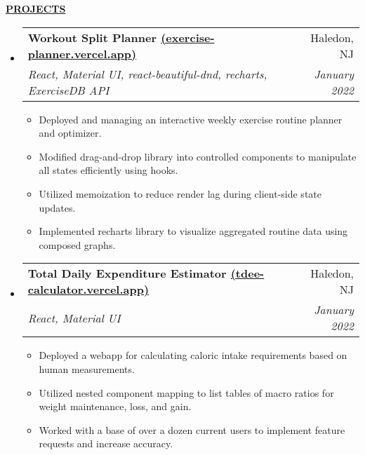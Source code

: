 \documentclass[letterpaper,11pt]{article}
\makeatletter
\newcommand{\resheading}[1]{{{\begin{minipage}{\textwidth}{\textbf{#1 \vphantom{p\^{E}}}}\end{minipage}}}}
\newcommand{\ressubheading}[4]{
\begin{tabular*}{7.3in}{l@{\extracolsep{\fill}}r}
		\textbf{#1} & #2 \\
		\textit{#3} & \textit{#4} \\
\end{tabular*}}
\makeatother
\begin{document}
\begin{spacing}{1.2}
\begin{itemize}[leftmargin=*]
\begin{itemize}[leftmargin=*]
	\end{itemize}

\end{itemize}
\vspace{-0.05in}

\resheading{\hspace{0em}\uline{\textsc{PROJECTS}\hfill}}
\vspace{-0.2in}

\begin{itemize}[leftmargin=*]
\item
	\ressubheading{Workout Split Planner \href{https://exercise-planner.vercel.app}{(exercise-planner.vercel.app)}}{Haledon, NJ}{React, Material UI, react-beautiful-dnd, recharts, ExerciseDB API}{January 2022}
	\vspace{-0.05in}
	\begin{itemize}[leftmargin=*]
	\setlength\itemsep{0em}
		\item{Deployed and managing an interactive weekly exercise routine planner and optimizer.}
		\item{Modified drag-and-drop library into controlled components to manipulate all states efficiently using hooks.}
		\item{Utilized memoization to reduce render lag during client-side state updates.}
		\item{Implemented recharts library to visualize aggregated routine data using composed graphs.}
	\end{itemize}
	
\item
	\ressubheading{Total Daily Expenditure Estimator \href{https://tdee-calculator.vercel.app}{(tdee-calculator.vercel.app)}}{Haledon, NJ}{React, Material UI}{January 2022}
	\vspace{-0.05in}
	\begin{itemize}[leftmargin=*]
	\setlength\itemsep{0em}
		\item{Deployed a webapp for calculating caloric intake requirements based on human measurements.}
		\item{Utilized nested component mapping to list tables of macro ratios for weight maintenance, loss, and gain.}
		\item{Worked with a base of over a dozen current users to implement feature requests and increase accuracy.}
	\end{itemize}
	

\end{itemize}
\end{spacing}
\end{document}
